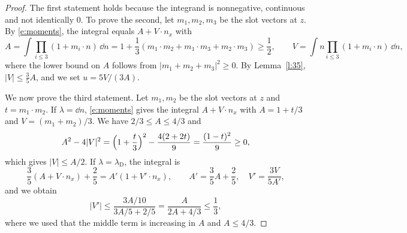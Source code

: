 \begin{proof}
The first statement holds because the integrand is nonnegative, continuous and not identically $0$. To prove the second, let $m_1, m_2, m_3$ be the slot vectors at $z$. By \eqref{e:moments}, the integral equals $A + V \cdot n_x$ with
\begin{equation*}
A = \int \prod_{i \le 3} (1 + m_i \cdot n) \, \dd n = 1 + \frac13 (m_1 \cdot m_2 + m_1 \cdot m_3 + m_2 \cdot m_3) \ge \frac12, \qquad V = \int n \prod_{i \le 3} (1 + m_i \cdot n) \, \dd n ,
\end{equation*}
where the lower bound on $A$ follows from $|m_1 + m_2 + m_3|^2 \ge 0$. By Lemma~\ref{l:35}, $|V| \le \frac35 A$, and we set $u = 5V/(3A)$.

We now prove the third statement. Let $m_1, m_2$ be the slot vectors at $z$ and $t = m_1 \cdot m_2$. If $\lambda = \dd n$, \eqref{e:moments} gives the integral $A + V \cdot n_x$ with $A = 1 + t/3$ and $V = (m_1 + m_2)/3$. We have $2/3 \le A \le 4/3$ and
\begin{equation*}
A^2 - 4 |V|^2 = \Bigl( 1 + \frac t3 \Bigr)^2 - \frac{4 (2 + 2t)}{9} = \frac{(1 - t)^2}{9} \ge 0 ,
\end{equation*}
which gives $|V| \le A/2$. If $\lambda = \lambda_{\mathrm D}$, the integral is
\begin{equation*}
\frac35 (A + V \cdot n_x) + \frac25 = A'(1 + V' \cdot n_x), \qquad A' = \frac35 A + \frac25, \quad V' = \frac{3V}{5A'} ,
\end{equation*}
and we obtain
\begin{equation*}
|V'| \le \frac{3A/10}{3A/5 + 2/5} = \frac{A}{2A + 4/3} \le \frac13 ,
\end{equation*}
where we used that the middle term is increasing in $A$ and $A \le 4/3$.
\end{proof}

